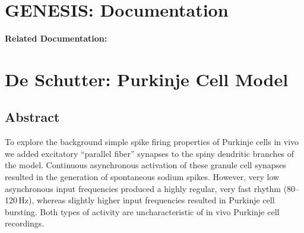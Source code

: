 \documentclass[12pt]{article}
\begin{document}
\section*{GENESIS: Documentation}

{\bf Related Documentation:}

\section*{De Schutter: Purkinje Cell Model}

\subsection*{Abstract}

To explore the background simple spike firing properties of
Purkinje cells in vivo we added excitatory ``parallel fiber'' synapses
to the spiny dendritic branches of the model. Continuous
asynchronous activation of these granule cell synapses resulted in
the generation of spontaneous sodium spikes. However, very low
asynchronous input frequencies produced a highly regular, very
fast rhythm (80--120\,Hz), whereas slightly higher input frequencies
resulted in Purkinje cell bursting. Both types of activity are
uncharacteristic of in vivo Purkinje cell recordings.
\end{document}
